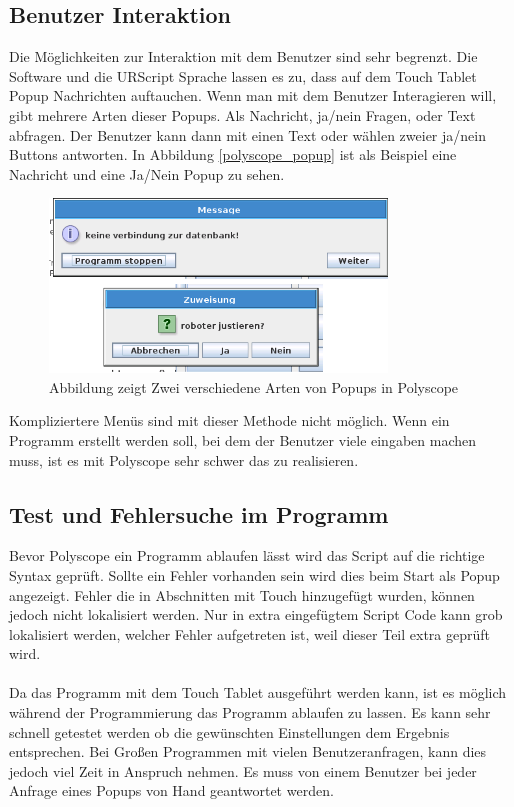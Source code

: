 \subsection{Benutzer Interaktion}
\label{user_interaktion_polyscope_rel}

Die Möglichkeiten zur Interaktion mit dem Benutzer sind sehr begrenzt. Die Software und die URScript Sprache lassen es zu, dass auf dem Touch Tablet \ac{Popup} Nachrichten auftauchen. Wenn man mit dem Benutzer Interagieren will, gibt mehrere Arten dieser \ac{Popup}s.
Als Nachricht, ja/nein Fragen, oder Text abfragen. Der Benutzer kann dann mit einen Text oder wählen zweier ja/nein Buttons antworten. In Abbildung \ref{polyscope_popup} ist als Beispiel eine Nachricht und eine Ja/Nein \ac{Popup} zu sehen.

\begin{figure}[H]
  \centering
    \includegraphics[width=0.8\textwidth]{pic/popup_question.png}
      \caption[Popup in Polyscope]{Abbildung zeigt Zwei verschiedene Arten von Popups in Polyscope}
      \label{fig:polyscope_popup}
\end{figure}

Kompliziertere Menüs sind mit dieser Methode nicht möglich. Wenn ein Programm erstellt werden soll, bei dem der Benutzer viele eingaben machen muss, ist es mit Polyscope sehr schwer das zu realisieren.

\subsection{Test und Fehlersuche im Programm}
\label{debuggin_polyscope_rel}

Bevor Polyscope ein Programm ablaufen lässt wird das Script auf die richtige Syntax geprüft. Sollte ein Fehler vorhanden sein wird dies beim Start als \ac{Popup} angezeigt. Fehler die in Abschnitten mit Touch hinzugefügt wurden, können jedoch nicht lokalisiert werden. Nur in extra eingefügtem Script Code kann grob lokalisiert werden, welcher Fehler aufgetreten ist, weil dieser Teil extra geprüft wird.
\\\\
Da das Programm mit dem Touch Tablet ausgeführt werden kann, ist es möglich während der Programmierung das Programm ablaufen zu lassen. Es kann sehr schnell getestet werden ob die gewünschten Einstellungen dem Ergebnis entsprechen. Bei Großen Programmen mit vielen Benutzeranfragen, kann dies jedoch viel Zeit in Anspruch nehmen. Es muss von einem Benutzer bei jeder Anfrage eines \ac{Popup}s von Hand geantwortet werden.

